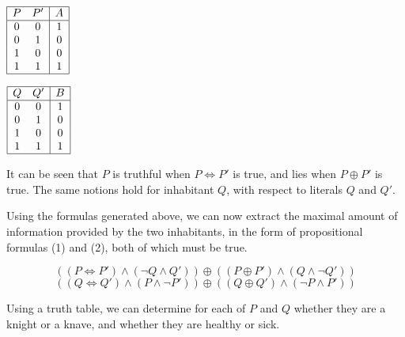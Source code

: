 \documentclass[12pt]{article}
\newcommand{\biim}{\mathbin{\Leftrightarrow}}
\begin{document}
\bigskip
\begin{minipage}{0.5\textwidth}
\begin{center}
$\begin{array}{|cc|c|}
   \hline
   P & P' & A
\\ \hline
   0 & 0 & 1
\\ 0 & 1 & 0
\\ 1 & 0 & 0
\\ 1 & 1 & 1
\\ \hline
\end{array}$
\end{center}
\end{minipage}
\begin{minipage}{0.35\textwidth}
\begin{center}
$\begin{array}{|cc|c|}
   \hline
   Q & Q' & B
\\ \hline
   0 & 0 & 1
\\ 0 & 1 & 0
\\ 1 & 0 & 0
\\ 1 & 1 & 1
\\ \hline
\end{array}$
\end{center}
\end{minipage}

\bigskip
\noindent
It can be seen that $P$ is truthful when $P \biim P'$ is true, and lies when $P 
\oplus P'$ is true. The same notions hold for inhabitant $Q$, with respect to 
literals $Q$ and $Q'$.

\bigskip
\noindent
Using the formulas generated above, we can now extract the maximal amount of information 
provided by the two  inhabitants, in the form of propositional formulas (1) and (2), both of which
must be true.

\medskip
\begin{equation}
((P \biim P') \land (\neg Q \land Q')) \oplus ((P \oplus P') \land (Q \land \neg Q'))
\end{equation}
\begin{equation}
((Q \biim Q') \land (P \land \neg P')) \oplus ((Q \oplus Q') \land (\neg P \land P'))
\end{equation}

\bigskip
\noindent
Using a truth table, we can determine for each of $P$ and $Q$ whether they 
are a knight or a knave, and whether they are healthy or sick.
\end{document}
